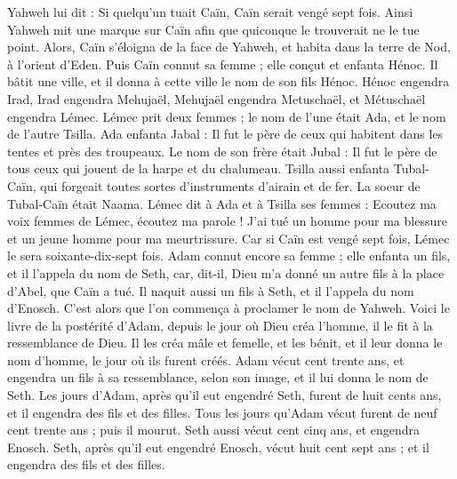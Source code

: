 \begin{multicols}{2}
Yahweh lui dit : Si quelqu’un tuait Caïn, Caïn serait vengé sept fois. Ainsi Yahweh mit une marque sur Caïn afin que quiconque le trouverait ne le tue point.
Alors, Caïn s’éloigna de la face de Yahweh, et habita dans la terre de Nod, à l'orient d’Eden.
Puis Caïn connut sa femme ; elle conçut et enfanta Hénoc. Il bâtit une ville, et il donna à cette ville le nom de son fils Hénoc.
Hénoc engendra Irad, Irad engendra Mehujaël, Mehujaël engendra Metuschaël, et Métuschaël engendra Lémec.
Lémec prit deux femmes ; le nom de l'une était Ada, et le nom de l'autre Tsilla.
Ada enfanta Jabal : Il fut le père de ceux qui habitent dans les tentes et près des troupeaux.
Le nom de son frère était Jubal : Il fut le père de tous ceux qui jouent de la harpe et du chalumeau.
Tsilla aussi enfanta Tubal-Caïn, qui forgeait toutes sortes d'instruments d'airain et de fer. La soeur de Tubal-Caïn était Naama.
Lémec dit à Ada et à Tsilla ses femmes : Ecoutez ma voix femmes de Lémec, écoutez ma parole ! J’ai tué un homme pour ma blessure et un jeune homme pour ma meurtrissure.
Car si Caïn est vengé sept fois, Lémec le sera soixante-dix-sept fois.
Adam connut encore sa femme ; elle enfanta un fils, et il l’appela du nom de Seth, car, dit-il, Dieu m'a donné un autre fils à la place d'Abel, que Caïn a tué.
Il naquit aussi un fils à Seth, et il l'appela du nom d’Enosch. C’est alors que l’on commença à proclamer le nom de Yahweh.
\VerseOne{}Voici le livre de la postérité d'Adam, depuis le jour où Dieu créa l'homme, il le fit à la ressemblance de Dieu.
Il les créa mâle et femelle, et les bénit, et il leur donna le nom d'homme, le jour où ils furent créés.
Adam vécut cent trente ans, et engendra un fils à sa ressemblance, selon son image, et il lui donna le nom de Seth.
Les jours d'Adam, après qu'il eut engendré Seth, furent de huit cents ans, et il engendra des fils et des filles.
Tous les jours qu'Adam vécut furent de neuf cent trente ans ; puis il mourut.
Seth aussi vécut cent cinq ans, et engendra Enosch.
Seth, après qu'il eut engendré Enosch, vécut huit cent sept ans ; et il engendra des fils et des filles.

\end{multicols}
